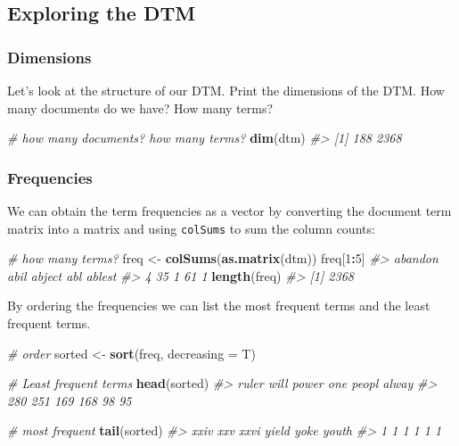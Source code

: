 \documentclass[]{book}
\newenvironment{Shaded}{\begin{snugshade}}{\end{snugshade}}
\newcommand{\CommentTok}[1]{\textcolor[rgb]{0.56,0.35,0.01}{\textit{#1}}}
\newcommand{\DataTypeTok}[1]{\textcolor[rgb]{0.13,0.29,0.53}{#1}}
\newcommand{\DecValTok}[1]{\textcolor[rgb]{0.00,0.00,0.81}{#1}}
\newcommand{\KeywordTok}[1]{\textcolor[rgb]{0.13,0.29,0.53}{\textbf{#1}}}
\newcommand{\NormalTok}[1]{#1}
\newcommand{\OperatorTok}[1]{\textcolor[rgb]{0.81,0.36,0.00}{\textbf{#1}}}
\newcommand{\StringTok}[1]{\textcolor[rgb]{0.31,0.60,0.02}{#1}}
\begin{document}
\hypertarget{exploring-the-dtm}{%
\subsection{Exploring the DTM}\label{exploring-the-dtm}}

\hypertarget{dimensions}{%
\subsubsection*{Dimensions}\label{dimensions}}

Let's look at the structure of our DTM. Print the dimensions of the DTM. How many documents do we have? How many terms?

\begin{Shaded}
\begin{Highlighting}[]
\CommentTok{# how many documents? how many terms?}
\KeywordTok{dim}\NormalTok{(dtm)}
\CommentTok{#> [1]  188 2368}
\end{Highlighting}
\end{Shaded}

\hypertarget{frequencies}{%
\subsubsection*{Frequencies}\label{frequencies}}

We can obtain the term frequencies as a vector by converting the document term matrix into a matrix and using \texttt{colSums} to sum the column counts:

\begin{Shaded}
\begin{Highlighting}[]
 \CommentTok{# how many terms?}
\NormalTok{freq <-}\StringTok{ }\KeywordTok{colSums}\NormalTok{(}\KeywordTok{as.matrix}\NormalTok{(dtm))}
\NormalTok{freq[}\DecValTok{1}\OperatorTok{:}\DecValTok{5}\NormalTok{]}
\CommentTok{#> abandon    abil  abject     abl  ablest }
\CommentTok{#>       4      35       1      61       1}
\KeywordTok{length}\NormalTok{(freq)}
\CommentTok{#> [1] 2368}
\end{Highlighting}
\end{Shaded}

By ordering the frequencies we can list the most frequent terms and the least frequent terms.

\begin{Shaded}
\begin{Highlighting}[]
\CommentTok{# order}
\NormalTok{sorted <-}\StringTok{ }\KeywordTok{sort}\NormalTok{(freq, }\DataTypeTok{decreasing =}\NormalTok{ T)}

\CommentTok{# Least frequent terms}
\KeywordTok{head}\NormalTok{(sorted)}
\CommentTok{#> ruler  will power   one peopl alway }
\CommentTok{#>   280   251   169   168    98    95}

\CommentTok{# most frequent}
\KeywordTok{tail}\NormalTok{(sorted)}
\CommentTok{#>  xxiv   xxv  xxvi yield  yoke youth }
\CommentTok{#>     1     1     1     1     1     1}
\end{Highlighting}
\end{Shaded}
\end{document}
